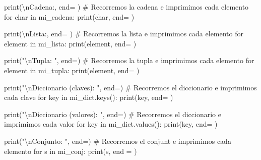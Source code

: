 \documentclass[
  letterpaper,
  DIV=11,
  numbers=noendperiod]{scrreprt}
\newenvironment{Shaded}{\begin{snugshade}}{\end{snugshade}}
\newcommand{\BuiltInTok}[1]{\textcolor[rgb]{0.00,0.23,0.31}{#1}}
\newcommand{\CharTok}[1]{\textcolor[rgb]{0.13,0.47,0.30}{#1}}
\newcommand{\CommentTok}[1]{\textcolor[rgb]{0.37,0.37,0.37}{#1}}
\newcommand{\ControlFlowTok}[1]{\textcolor[rgb]{0.00,0.23,0.31}{#1}}
\newcommand{\KeywordTok}[1]{\textcolor[rgb]{0.00,0.23,0.31}{#1}}
\newcommand{\NormalTok}[1]{\textcolor[rgb]{0.00,0.23,0.31}{#1}}
\newcommand{\OperatorTok}[1]{\textcolor[rgb]{0.37,0.37,0.37}{#1}}
\newcommand{\StringTok}[1]{\textcolor[rgb]{0.13,0.47,0.30}{#1}}
\begin{document}
\begin{Shaded}
\begin{Highlighting}[]
\BuiltInTok{print}\NormalTok{(}\StringTok{\textquotesingle{}}\CharTok{\textbackslash{}n}\StringTok{Cadena:\textquotesingle{}}\NormalTok{, end}\OperatorTok{=}\StringTok{\textquotesingle{} \textquotesingle{}}\NormalTok{)}
\CommentTok{\# Recorremos la cadena e imprimimos cada elemento }
\ControlFlowTok{for}\NormalTok{ char }\KeywordTok{in}\NormalTok{ mi\_cadena:}
    \BuiltInTok{print}\NormalTok{(char, end}\OperatorTok{=}\StringTok{\textquotesingle{} \textquotesingle{}}\NormalTok{)}

\BuiltInTok{print}\NormalTok{(}\StringTok{\textquotesingle{}}\CharTok{\textbackslash{}n}\StringTok{Lista:\textquotesingle{}}\NormalTok{, end}\OperatorTok{=}\StringTok{\textquotesingle{} \textquotesingle{}}\NormalTok{)}
\CommentTok{\# Recorremos la lista e imprimimos cada elemento }
\ControlFlowTok{for}\NormalTok{ element }\KeywordTok{in}\NormalTok{ mi\_lista:}
    \BuiltInTok{print}\NormalTok{(element, end}\OperatorTok{=}\StringTok{\textquotesingle{} \textquotesingle{}}\NormalTok{)}

\BuiltInTok{print}\NormalTok{(}\StringTok{"}\CharTok{\textbackslash{}n}\StringTok{Tupla: "}\NormalTok{, end}\OperatorTok{=}\StringTok{\textquotesingle{}\textquotesingle{}}\NormalTok{)}
\CommentTok{\# Recorremos la tupla e imprimimos cada elemento }
\ControlFlowTok{for}\NormalTok{ element }\KeywordTok{in}\NormalTok{ mi\_tupla:}
    \BuiltInTok{print}\NormalTok{(element, end}\OperatorTok{=}\StringTok{\textquotesingle{} \textquotesingle{}}\NormalTok{)}

\BuiltInTok{print}\NormalTok{(}\StringTok{"}\CharTok{\textbackslash{}n}\StringTok{Diccionario  (claves): "}\NormalTok{, end}\OperatorTok{=}\StringTok{\textquotesingle{}\textquotesingle{}}\NormalTok{) }
\CommentTok{\# Recorremos el diccionario e imprimimos cada clave }
\ControlFlowTok{for}\NormalTok{ key }\KeywordTok{in}\NormalTok{ mi\_dict.keys():}
    \BuiltInTok{print}\NormalTok{(key, end}\OperatorTok{=}\StringTok{\textquotesingle{} \textquotesingle{}}\NormalTok{)}

\BuiltInTok{print}\NormalTok{(}\StringTok{"}\CharTok{\textbackslash{}n}\StringTok{Diccionario (valores): "}\NormalTok{, end}\OperatorTok{=}\StringTok{\textquotesingle{}\textquotesingle{}}\NormalTok{) }
\CommentTok{\# Recorremos el diccionario e imprimimos cada valor }
\ControlFlowTok{for}\NormalTok{ key }\KeywordTok{in}\NormalTok{ mi\_dict.values():}
    \BuiltInTok{print}\NormalTok{(key, end}\OperatorTok{=}\StringTok{\textquotesingle{} \textquotesingle{}}\NormalTok{)}

\BuiltInTok{print}\NormalTok{(}\StringTok{"}\CharTok{\textbackslash{}n}\StringTok{Conjunto: "}\NormalTok{, end}\OperatorTok{=}\StringTok{\textquotesingle{}\textquotesingle{}}\NormalTok{) }
\CommentTok{\# Recorremos el conjunt e imprimimos cada elemento }
\ControlFlowTok{for}\NormalTok{ s }\KeywordTok{in}\NormalTok{ mi\_conj:}
    \BuiltInTok{print}\NormalTok{(s, end }\OperatorTok{=} \StringTok{\textquotesingle{} \textquotesingle{}}\NormalTok{)}
    

\end{Highlighting}
\end{Shaded}
\end{document}
